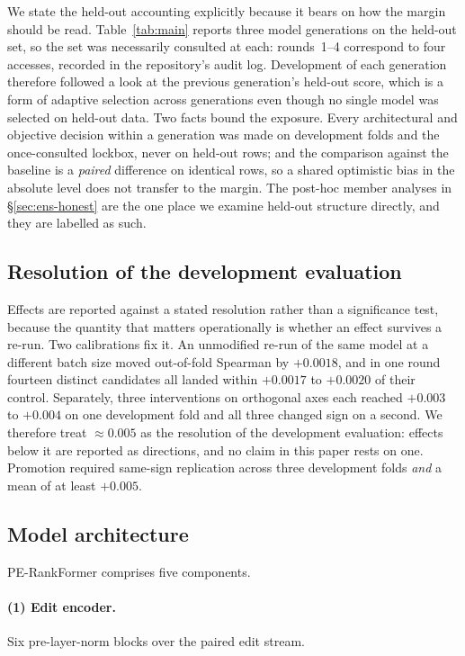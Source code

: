 \documentclass[11pt]{article}
\begin{document}
We state the held-out accounting explicitly because it bears on how the margin should
be read. Table~\ref{tab:main} reports three model generations on the held-out set, so
the set was necessarily consulted at each: rounds~1--4 correspond to four accesses,
recorded in the repository's audit log. Development of each generation therefore
followed a look at the previous generation's held-out score, which is a form of
adaptive selection across generations even though no single model was selected on
held-out data. Two facts bound the exposure. Every architectural and objective decision
within a generation was made on development folds and the once-consulted lockbox, never
on held-out rows; and the comparison against the baseline is a \emph{paired} difference
on identical rows, so a shared optimistic bias in the absolute level does not transfer
to the margin. The post-hoc member analyses in \S\ref{sec:ens-honest} are the one place
we examine held-out structure directly, and they are labelled as such.

\subsection{Resolution of the development evaluation}
\label{sec:resolution}

Effects are reported against a stated resolution rather than a significance test,
because the quantity that matters operationally is whether an effect survives a
re-run. Two calibrations fix it. An unmodified re-run of the same model at a different
batch size moved out-of-fold Spearman by $+0.0018$, and in one round fourteen distinct
candidates all landed within $+0.0017$ to $+0.0020$ of their control. Separately, three
interventions on orthogonal axes each reached $+0.003$ to $+0.004$ on one development
fold and all three changed sign on a second. We therefore treat
$\approx\!0.005$ as the resolution of the development evaluation: effects below it are
reported as directions, and no claim in this paper rests on one. Promotion required
same-sign replication across three development folds \emph{and} a mean of at least
$+0.005$.

\subsection{Model architecture}

PE-RankFormer comprises five components.

\paragraph{(1) Edit encoder.} Six pre-layer-norm blocks over the paired edit stream.
\end{document}
